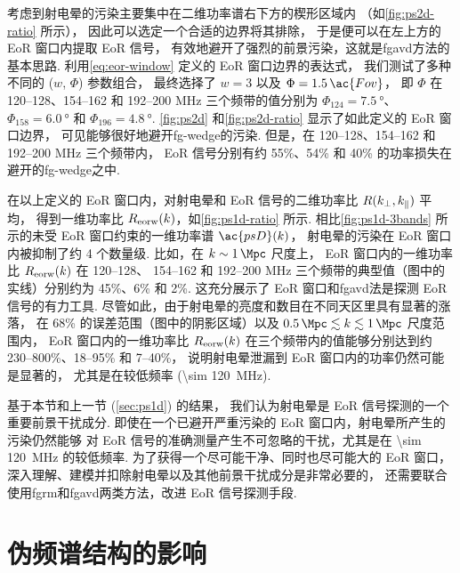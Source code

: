 考虑到射电晕的污染主要集中在二维功率谱右下方的楔形区域内
（如\autoref{fig:ps2d-ratio} 所示），
因此可以选定一个合适的边界将其排除，
于是便可以在左上方的 EoR 窗口内提取 EoR 信号，
有效地避开了强烈的前景污染，这就是\ac{fgavd}方法的基本思路.
利用\autoref{eq:eor-window} 定义的 EoR 窗口边界的表达式，
我们测试了多种不同的 ($w$, $\Phi$) 参数组合，
最终选择了 $w = 3$ 以及 $\Phi = 1.5\,\ac{Fov}$，
即 $\Phi$ 在 \numrange{120}{128}、\numrange{154}{162}
和 \numrange{192}{200} \si{\MHz} 三个频带的值分别为
$\Phi_{124} = \SI{7.5}{\degree}$、
$\Phi_{158} = \SI{6.0}{\degree}$ 和
$\Phi_{196} = \SI{4.8}{\degree}$.
\autoref{fig:ps2d} 和\autoref{fig:ps2d-ratio} 显示了如此定义的 EoR 窗口边界，
可见能够很好地避开\ac{fg-wedge}的污染.
但是，在 \numrange{120}{128}、\numrange{154}{162}
和 \numrange{192}{200} \si{\MHz} 三个频带内，
EoR 信号分别有约 55\%、54\% 和 40\% 的功率损失在避开的\ac{fg-wedge}之中.

在以上定义的 EoR 窗口内，对射电晕和 EoR 信号的二维功率比 $R(k_{\perp}, k_{\parallel})$ 平均，
得到一维功率比 $R_{\mathrm{eorw}}(k)$，如\autoref{fig:ps1d-ratio} 所示.
相比\autoref{fig:ps1d-3bands} 所示的未受 EoR 窗口约束的一维功率谱 $\ac{psD}(k)$，
射电晕的污染在 EoR 窗口内被抑制了约 4 个数量级.
比如，在 $k \sim \SI{1}{\per\Mpc}$ 尺度上，
EoR 窗口内的一维功率比 $R_{\mathrm{eorw}}(k)$ 在 \numrange{120}{128}、
\numrange{154}{162} 和 \numrange{192}{200} \si{\MHz}
三个频带的典型值（图中的实线）分别约为 45\%、6\% 和 2\%.
这充分展示了 EoR 窗口和\ac{fgavd}法是探测 EoR 信号的有力工具.
尽管如此，由于射电晕的亮度和数目在不同天区里具有显著的涨落，
在 68\% 的误差范围（图中的阴影区域）以及
$\SI{0.5}{\per\Mpc} \lesssim k \lesssim \SI{1}{\per\Mpc}$ 尺度范围内，
EoR 窗口内的一维功率比 $R_{\mathrm{eorw}}(k)$ 在三个频带内的值能够分别达到约
\numrange{230}{800}\%、\numrange{18}{95}\% 和 \numrange{7}{40}\%，
说明射电晕泄漏到 EoR 窗口内的功率仍然可能是显著的，
尤其是在较低频率 (\SI{\sim 120}{\MHz}).

基于本节和上一节 (\autoref{sec:ps1d}) 的结果，
我们认为射电晕是 EoR 信号探测的一个重要前景干扰成分.
即使在一个已避开严重污染的 EoR 窗口内，射电晕所产生的污染仍然能够
对 EoR 信号的准确测量产生不可忽略的干扰，尤其是在 \SI{\sim 120}{\MHz} 的较低频率.
为了获得一个尽可能干净、同时也尽可能大的 EoR 窗口，
深入理解、建模并扣除射电晕以及其他前景干扰成分是非常必要的，
还需要联合使用\ac{fgrm}和\ac{fgavd}两类方法，改进 EoR 信号探测手段.


\section{伪频谱结构的影响}
\label{sec:freq-artifacts}

